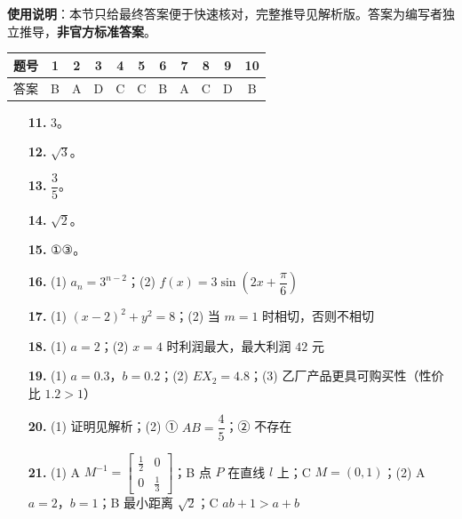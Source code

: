 
\begin{gknotice}
\textbf{使用说明}：本节只给最终答案便于快速核对，完整推导见解析版。答案为编写者独立推导，\textbf{非官方标准答案}。
\end{gknotice}

\begin{center}\begin{tabular}{ccccccccccc}
\toprule
题号 & 1 & 2 & 3 & 4 & 5 & 6 & 7 & 8 & 9 & 10 \\
\midrule
答案 & B & A & D & C & C & B & A & C & D & B \\
\bottomrule
\end{tabular}\end{center}

\begin{itemize}[leftmargin=2.6em]
  \item[\textbf{11.}] $3$。
  \item[\textbf{12.}] $\sqrt3$。
  \item[\textbf{13.}] $\dfrac35$。
  \item[\textbf{14.}] $\sqrt2$。
  \item[\textbf{15.}] ①③。
\end{itemize}

\begin{itemize}[leftmargin=2.6em]
  \item[\textbf{16.}] (1) $a_n=3^{n-2}$；(2) $f(x)=3\sin\left(2x+\dfrac\pi6\right)$
  \item[\textbf{17.}] (1) $(x-2)^2+y^2=8$；(2) 当 $m=1$ 时相切，否则不相切
  \item[\textbf{18.}] (1) $a=2$；(2) $x=4$ 时利润最大，最大利润 $42$ 元
  \item[\textbf{19.}] (1) $a=0.3$，$b=0.2$；(2) $EX_2=4.8$；(3) 乙厂产品更具可购买性（性价比 $1.2>1$）
  \item[\textbf{20.}] (1) 证明见解析；(2) ① $AB=\dfrac45$；② 不存在
  \item[\textbf{21.}] (1) A $M^{-1}=\begin{bmatrix}\frac12&0\\0&\frac13\end{bmatrix}$；B 点 $P$ 在直线 $l$ 上；C $M=(0,1)$；(2) A $a=2$，$b=1$；B 最小距离 $\sqrt2$；C $ab+1>a+b$
\end{itemize}
